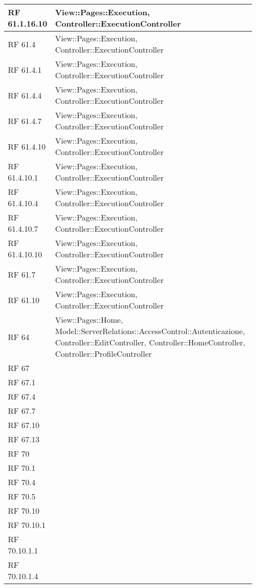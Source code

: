 {\begin{longtable} [c]{| p{2cm} | p{14cm} |}
 \hline 
RF 61.1.16.10 & View::Pages::\-Execution, Controller::\-ExecutionController\\ 
 \hline 
RF 61.4 & View::Pages::\-Execution, Controller::\-ExecutionController\\ 
 \hline 
RF 61.4.1 & View::Pages::\-Execution, Controller::\-ExecutionController\\ 
 \hline 
RF 61.4.4 & View::Pages::\-Execution, Controller::\-ExecutionController\\ 
 \hline 
RF 61.4.7 & View::Pages::\-Execution, Controller::\-ExecutionController\\ 
 \hline 
RF 61.4.10 & View::Pages::\-Execution, Controller::\-ExecutionController\\ 
 \hline 
RF 61.4.10.1 & View::Pages::\-Execution, Controller::\-ExecutionController\\ 
 \hline 
RF 61.4.10.4 & View::Pages::\-Execution, Controller::\-ExecutionController\\ 
 \hline 
RF 61.4.10.7 & View::Pages::\-Execution, Controller::\-ExecutionController\\ 
 \hline 
RF 61.4.10.10 & View::Pages::\-Execution, Controller::\-ExecutionController\\ 
 \hline 
RF 61.7 & View::Pages::\-Execution, Controller::\-ExecutionController\\ 
 \hline 
RF 61.10 & View::Pages::\-Execution, Controller::\-ExecutionController\\ 
 \hline 
RF 64 & View::Pages::\-Home, Model::ServerRelations::AccessControl::\-Autenticazione, Controller::\-EditController, Controller::\-HomeController, Controller::\-ProfileController\\ 
 \hline 
RF 67 & \\ 
 \hline 
RF 67.1 & \\ 
 \hline 
RF 67.4 & \\ 
 \hline 
RF 67.7 & \\ 
 \hline 
RF 67.10 & \\ 
 \hline 
RF 67.13 & \\ 
 \hline 
RF 70 & \\ 
 \hline 
RF 70.1 & \\ 
 \hline 
RF 70.4 & \\ 
 \hline 
RF 70.5 & \\ 
 \hline 
RF 70.10 & \\ 
 \hline 
RF 70.10.1 & \\ 
 \hline 
RF 70.10.1.1 & \\ 
 \hline 
RF 70.10.1.4 & \\ 

\end{longtable}}
